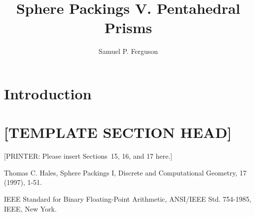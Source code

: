 \documentclass[11pt]{amsart}
\title{Sphere Packings V. Pentahedral Prisms}
\author{Samuel P. Ferguson}
\begin{document}
\begin{abstract}

\end{abstract}

\maketitle

\section*{Introduction}



\section*{[TEMPLATE SECTION HEAD]}

[PRINTER: Please insert Sections~15, 16, and 17 here.]






\begin{thebibliography}{Hal97a}

 Thomas C. Hales, Sphere Packings I,
    Discrete and Computational Geometry, 17 (1997), 1-51.

 IEEE Standard for Binary Floating-Point
Arithmetic, ANSI/IEEE Std. 754-1985, IEEE, New York.




\end{thebibliography}
\end{document}
